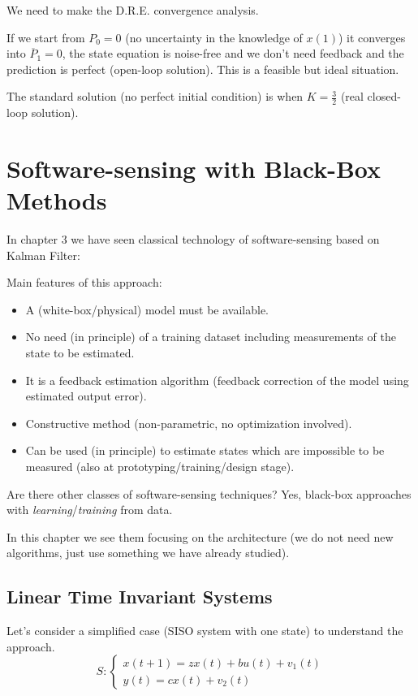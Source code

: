 We need to make the D.R.E. convergence analysis.

If we start from $P_0=0$ (no uncertainty in the knowledge of $x(1)$) it converges into $\overline{P}_1=0$, the state equation is noise-free and we don't need feedback and the prediction is perfect (open-loop solution).
This is a feasible but ideal situation.

The standard solution (no perfect initial condition) is when $K=\frac{3}{2}$ (real closed-loop solution).

\chapter{Software-sensing with Black-Box Methods}

In chapter 3 we have seen classical technology of software-sensing based on Kalman Filter:

Main features of this approach:
\begin{itemize}
    \item A (white-box/physical) model must be available.
    \item No need (in principle) of a training dataset including measurements of the state to be estimated.
    \item It is a feedback estimation algorithm (feedback correction of the model using estimated output error).
    \item Constructive method (non-parametric, no optimization involved).
    \item Can be used (in principle) to estimate states which are impossible to be measured (also at prototyping/training/design stage).
\end{itemize}

Are there other classes of software-sensing techniques? Yes, black-box approaches with \emph{learning}/\emph{training} from data.

In this chapter we see them focusing on the architecture (we do not need new algorithms, just use something we have already studied).

\section{Linear Time Invariant Systems}

Let's consider a simplified case (SISO system with one state) to understand the approach.
\[
    S: \begin{cases}
        x(t+1) = zx(t) + bu(t) + v_1(t) \\
        y(t) = cx(t) + v_2(t)
    \end{cases}
\]

